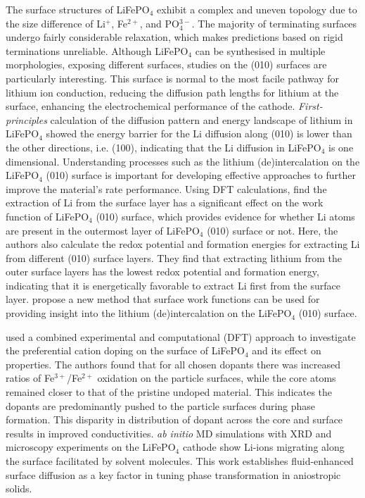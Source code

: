 \documentclass[../main.tex]{subfiles}
\begin{document}
The surface structures of LiFePO$_4$ exhibit a complex and uneven topology due to the size difference of Li$^+$, Fe$^{2+}$, and PO$_{4}^{3-}$. The majority of terminating surfaces undergo fairly considerable relaxation, which makes predictions based on rigid terminations unreliable. Although LiFePO$_4$ can be synthesised in multiple morphologies, \cite{chen2006electron,ellis2007synthesis} exposing different surfaces, studies on the (010) surfaces are particularly interesting. This surface is normal to the most facile pathway for lithium ion conduction, \cite{islam2010recent} reducing the diffusion path lengths for lithium at the surface, enhancing the electrochemical performance of the cathode. \textit{First-principles} calculation of the diffusion pattern and energy landscape of lithium in LiFePO$_4$ showed the energy barrier for the Li diffusion along (010) is lower than the other directions, i.e. (100), indicating that the Li diffusion in LiFePO$_4$ is one dimensional. \cite{tankhilsaikhan2019density} Understanding processes such as the lithium (de)intercalation on the LiFePO$_4$ (010) surface is important for developing effective approaches to further improve the material's rate performance. Using DFT calculations, \citeauthor{xu2019insight} find the extraction of Li from the surface layer has a significant effect on the work function of LiFePO$_4$ (010) surface, which provides evidence for whether Li atoms are present in the outermost layer of LiFePO$_4$ (010) surface or not. \cite{xu2019insight} Here, the authors also calculate the redox potential and formation energies for extracting Li from different (010) surface layers. They find that extracting lithium from the outer surface layers has the lowest redox potential and formation energy, indicating that it is energetically favorable to extract Li first from the surface layer. \citeauthor{xu2019insight} propose a new method that surface work functions can be used for providing insight into the lithium (de)intercalation on the LiFePO$_4$ (010) surface. \cite{xu2019insight}

\citeauthor{zhang2020observation} used a combined experimental and computational (DFT) approach to investigate the preferential cation doping on the surface of LiFePO$_4$ and its effect on properties. \cite{zhang2020observation} The authors found that for all chosen dopants there was increased ratios of Fe$^{3+}$/Fe$^{2+}$ oxidation on the particle surfaces, while the core atoms remained closer to that of the pristine undoped material. This indicates the dopants are predominantly pushed to the particle surfaces during phase formation. This disparity in distribution of dopant across the core and surface results in improved conductivities. \cite{zhang2020observation} \textit{ab initio} MD simulations with XRD and microscopy experiments on the LiFePO$_4$ cathode show Li-ions migrating along the surface facilitated by solvent molecules. \cite{li2018fluid} This work establishes fluid-enhanced surface diffusion as a key factor in tuning phase transformation in aniostropic solids.
\end{document}
